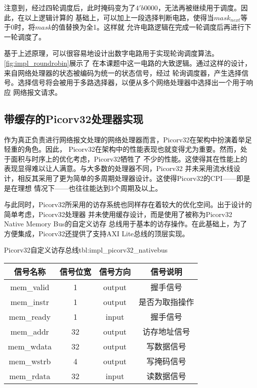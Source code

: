 注意到，经过四轮调度后，此时掩码变为了$4'b0000$，无法再被继续用于调度。因此，在以上逻辑计算的
基础上，可以加上一段选择判断电路，使得当$mask_{next}$等于0时，将$mask$的值替换为全1。这样就
允许电路逻辑在完成一轮调度后再进行下一轮调度了。


基于上述原理，可以很容易地设计出数字电路用于实现轮询调度算法。\autoref{fig:impl_roundrobin}展示了
在本课题中这一电路的大致逻辑。通过这样的设计，来自网络处理器的状态被编码为统一的状态信号，经过
轮询调度器，产生选择信号。选择信号将会被用于多路选择器，以便从多个网络处理器中选择出一个用于响应
网络报文请求。

\subsection{带缓存的Picorv32处理器实现}

作为真正负责进行网络报文处理的网络处理器而言，Picorv32在架构中扮演着举足轻重的角色。因此，
Picorv32在架构中的性能表现也就变得尤为重要。然而，处于面积与时序上的优化考虑，Picorv32牺牲了
不少的性能\cite{picorv32}。这使得其在性能上的表现显得难以让人满意。与大多数的处理器不同，Picorv32
并未采用流水线设计，相反其采用了更为简单的多周期处理器设计。这使得Picorv32的CPI——即是是在理想
情况下——也往往能达到3个周期及以上。

与此同时，Picorv32所采用的访存系统也同样存在着较大的优化空间。出于设计的简单考虑，Picorv32处理器
并未使用缓存设计，而是使用了被称为Picorv32 Native Memory Bus\cite{picorv32}的自定义访存
总线用于基本的访存操作。在此基础上，为了方便集成，Picorv32还提供了支持AXI Lite总线的顶层实现。

\begin{generaltab}{Picorv32自定义访存总线\cite{picorv32}}{tbl:impl_picorv32_nativebus}
  \begin{tabular}{cccc}
    \toprule
    信号名称 & 信号位宽 & 信号方向 & 信号说明 \\
    \midrule
    mem\_valid & 1 & output & 握手信号 \\
    mem\_instr & 1 & output & 是否为取指操作 \\
    mem\_ready & 1 & input & 握手信号 \\
    mem\_addr & 32 & output & 访存地址信号 \\
    mem\_wdata & 32 & output & 写数据信号 \\
    mem\_wstrb & 4 & output & 写掩码信号 \\
    mem\_rdata & 32 & input & 读数据信号 \\
    \bottomrule
  \end{tabular}
\end{generaltab}

